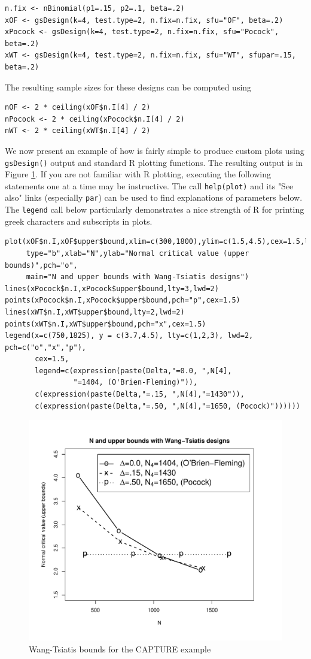 \bigskip

\begin{verbatim}
n.fix <- nBinomial(p1=.15, p2=.1, beta=.2)
xOF <- gsDesign(k=4, test.type=2, n.fix=n.fix, sfu="OF", beta=.2)
xPocock <- gsDesign(k=4, test.type=2, n.fix=n.fix, sfu="Pocock", beta=.2)
xWT <- gsDesign(k=4, test.type=2, n.fix=n.fix, sfu="WT", sfupar=.15, beta=.2)
\end{verbatim}
The resulting sample sizes for these designs can be computed using
\begin{verbatim}
nOF <- 2 * ceiling(xOF$n.I[4] / 2)
nPocock <- 2 * ceiling(xPocock$n.I[4] / 2)
nWT <- 2 * ceiling(xWT$n.I[4] / 2)
\end{verbatim}
We now present an example of how is fairly simple to produce custom plots using \texttt{gsDesign()} output and standard R plotting functions. The resulting output is in Figure \ref{fig:WT}. If you are not familiar with R plotting, executing the following statements one at a time may be instructive.
The call \texttt{help(plot)} and its "See also" links (especially \texttt{par}) can be used to find explanations of parameters below.
The \texttt{legend} call below particularly demonstrates a nice strength of R for printing greek characters and subscripts in plots.
\begin{verbatim}
plot(xOF$n.I,xOF$upper$bound,xlim=c(300,1800),ylim=c(1.5,4.5),cex=1.5,lwd=2,
     type="b",xlab="N",ylab="Normal critical value (upper bounds)",pch="o",
     main="N and upper bounds with Wang-Tsiatis designs")
lines(xPocock$n.I,xPocock$upper$bound,lty=3,lwd=2)
points(xPocock$n.I,xPocock$upper$bound,pch="p",cex=1.5)
lines(xWT$n.I,xWT$upper$bound,lty=2,lwd=2)
points(xWT$n.I,xWT$upper$bound,pch="x",cex=1.5)
legend(x=c(750,1825), y = c(3.7,4.5), lty=c(1,2,3), lwd=2, pch=c("o","x","p"),
       cex=1.5,
       legend=c(expression(paste(Delta,"=0.0, ",N[4],
                "=1404, (O'Brien-Fleming)")), 
       c(expression(paste(Delta,"=.15, ",N[4],"=1430")), 
       c(expression(paste(Delta,"=.50, ",N[4],"=1650, (Pocock)"))))))
\end{verbatim}

\bigskip
\begin{figure}
\begin{center}
\includegraphics[width=.6\textwidth]{figs/WTCAPTURE.pdf}
\end{center}
\caption{Wang-Tsiatis bounds for the CAPTURE example\label{fig:WT}}
\end{figure}%

